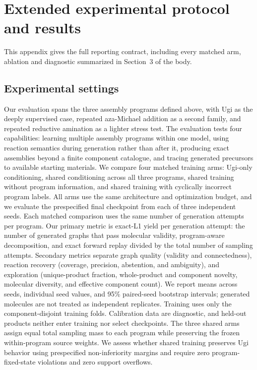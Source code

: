 \documentclass{article}
\begin{document}
\clearpage

\section{Extended experimental protocol and results}
\label{app:results}

This appendix gives the full reporting contract, including every matched arm, ablation and diagnostic summarized in Section~3 of the body.

\subsection{Experimental settings}

Our evaluation spans the three assembly programs defined above, with Ugi as the deeply supervised
case, repeated aza-Michael addition as a second family, and repeated reductive amination as a lighter
stress test.
The evaluation tests four capabilities: learning multiple assembly programs within one model, using
reaction semantics during generation rather than after it, producing exact assemblies beyond a
finite component catalogue, and tracing generated precursors to available starting materials.
We compare four matched training arms: Ugi-only conditioning, shared conditioning across all three
programs, shared training without program information, and shared training with cyclically incorrect
program labels.
All arms use the same architecture and optimization budget, and we evaluate the prespecified final
checkpoint from each of three independent seeds.
Each matched comparison uses the same number of generation attempts per program.
Our primary metric is exact-L1 yield per generation attempt: the number of generated graphs that
pass molecular validity, program-aware decomposition, and exact forward replay divided by the total
number of sampling attempts.
Secondary metrics separate graph quality (validity and connectedness), reaction recovery (coverage,
precision, abstention, and ambiguity), and exploration (unique-product fraction, whole-product and
component novelty, molecular diversity, and effective component count).
We report means across seeds, individual seed values, and 95\% paired-seed bootstrap intervals;
generated molecules are not treated as independent replicates.
Training uses only the component-disjoint training folds.
Calibration data are diagnostic, and held-out products neither enter training nor select
checkpoints.
The three shared arms assign equal total sampling mass to each program while preserving the frozen
within-program source weights.
We assess whether shared training preserves Ugi behavior using prespecified non-inferiority margins
and require zero program-fixed-state violations and zero support overflows.
\end{document}
